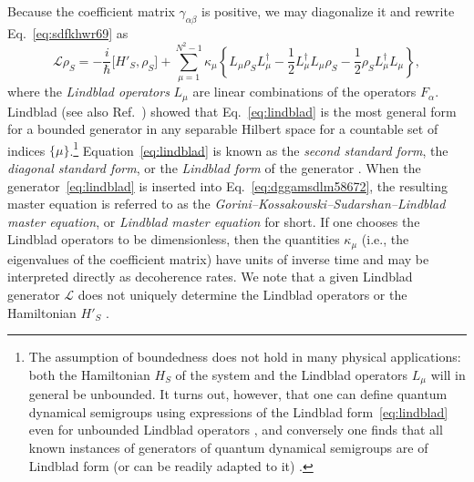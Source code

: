 \documentclass[3p,sort&compress,12pt]{elsarticle}
\newcommand{\I}{\ensuremath{i}}
\newcommand{\op}[1]{#1}
\begin{document}
Because the coefficient matrix $\gamma_{\alpha\beta}$ is positive, we may diagonalize it and rewrite Eq.~\eqref{eq:sdfkhwr69} as
%
\begin{equation}\label{eq:lindblad}
\mathcal{L}\op{\rho}_S = -\frac{\I}{\hbar} \bigl[
  \op{H}'_S, \op{\rho}_S \bigr] + \sum_{\mu=1}^{N^2-1} \kappa_\mu \left\{
\op{L}_\mu \op{\rho}_S \op{L}^\dagger_\mu - \frac{1}{2} \op{L}^\dagger_\mu\op{L}_\mu \op{\rho}_S
- \frac{1}{2} \op{\rho}_S\op{L}^\dagger_\mu\op{L}_\mu \right\},
\end{equation}
%
where the \emph{Lindblad operators} $\op{L}_\mu$ are linear combinations of the operators $\op{F}_\alpha$. Lindblad \cite{Lindblad:1976:um} (see also Ref.~\cite{Gorini:1978:uf}) showed that Eq.~\eqref{eq:lindblad} is the most general form for a bounded generator in any separable Hilbert space for a countable set of indices $\{\mu\}$.\footnote{The assumption of boundedness does not hold in many physical applications: both the Hamiltonian $\op{H}_S$ of the system and the Lindblad operators $\op{L}_\mu$ will in general be unbounded. It turns out, however, that one can define quantum dynamical semigroups using expressions of the Lindblad form~\eqref{eq:lindblad} even for unbounded Lindblad operators \cite{Davies:1976:uu,Holevo:1996:ll}, and conversely one finds that all known instances of generators of quantum dynamical semigroups are of Lindblad form (or can be readily adapted to it) \cite{Breuer:2002:oq,Alicki:2007:uu}.}  Equation~\eqref{eq:lindblad} is known as the \emph{second standard form}, the \emph{diagonal standard form}, or the \emph{Lindblad form} of the generator \cite{Breuer:2002:oq,Alicki:2007:uu}. When the generator~\eqref{eq:lindblad} is inserted into Eq.~\eqref{eq:dggamsdlm58672}, the resulting master equation is referred to as the \emph{Gorini--Kossakowski--Sudarshan--Lindblad master equation}, or \emph{Lindblad master equation} for short. If one chooses the Lindblad operators to be dimensionless, then the quantities $\kappa_\mu$ (i.e., the eigenvalues of the coefficient matrix) have units of inverse time and may be interpreted directly as decoherence rates. We note that a given Lindblad generator $\mathcal{L}$ does not uniquely determine the Lindblad operators or the Hamiltonian $\op{H}'_S$ \cite{Breuer:2002:oq}.
\end{document}
